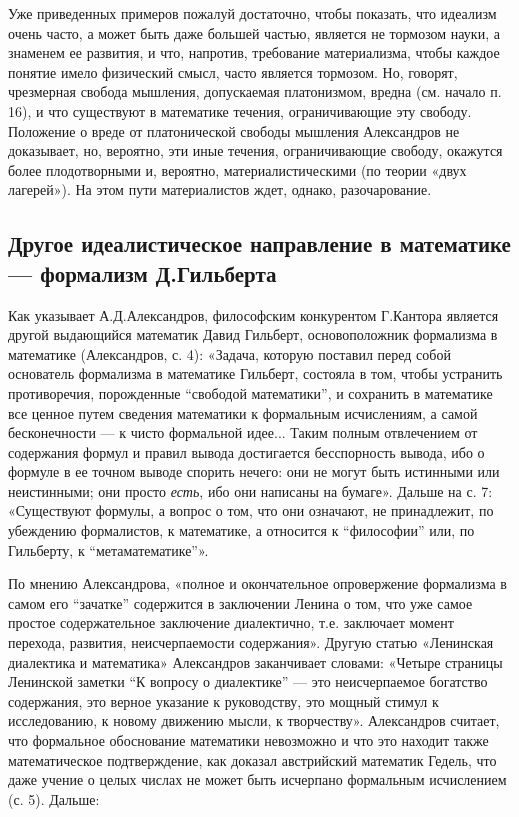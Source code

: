 Уже  приведенных  примеров  пожалуй достаточно,  чтобы  показать,  что
идеализм  очень часто,  а  может быть  даже  большей частью,  является
не  тормозом  науки,   а  знаменем  ее  развития,   и  что,  напротив,
требование материализма, чтобы каждое  понятие имело физический смысл,
часто  является тормозом.  Но, говорят,  чрезмерная свобода  мышления,
допускаемая платонизмом, вредна (см. начало п. 16), и что существуют в
математике  течения, ограничивающие  эту  свободу.  Положение о  вреде
от  платонической  свободы  мышления Александров  не  доказывает,  но,
вероятно,  эти иные  течения, ограничивающие  свободу, окажутся  более
плодотворными  и,  вероятно,   материалистическими  (по  теории  «двух
лагерей»). На этом пути материалистов ждет, однако, разочарование.

\subsection{Другое  идеалистическое   направление  в   математике  ---
формализм Д.Гильберта}

Как  указывает  А.Д.Александров,   философским  конкурентом  Г.Кантора
является  другой выдающийся  математик Давид  Гильберт, основоположник
формализма  в   математике  (Александров,  с.  4):   «Задача,  которую
поставил  перед собой  основатель  формализма  в математике  Гильберт,
состояла в  том, чтобы устранить противоречия,  порожденные ``свободой
математики'',  и  сохранить в  математике  все  ценное путем  сведения
математики к формальным исчислениям, а самой бесконечности --- к чисто
формальной  идее... Таким  полным отвлечением  от содержания  формул и
правил  вывода достигается  бесспорность вывода,  ибо о  формуле в  ее
точном  выводе  спорить  нечего:  они  не  могут  быть  истинными  или
неистинными;  они просто  \emph{есть},  ибо они  написаны на  бумаге».
Дальше на с. 7: «Существуют формулы, а вопрос о том, что они означают,
не принадлежит, по убеждению формалистов,  к математике, а относится к
``философии'' или, по Гильберту, к ``метаматематике''».

По   мнению  Александрова,   «полное   и  окончательное   опровержение
формализма в  самом его ``зачатке''  содержится в заключении  Ленина о
том, что уже самое простое содержательное заключение диалектично, т.е.
заключает  момент  перехода,  развития,  неисчерпаемости  содержания».
Другую   статью  «Ленинская   диалектика  и   математика»  Александров
заканчивает словами:  «Четыре страницы  Ленинской заметки  ``К вопросу
о  диалектике''  ---  это   неисчерпаемое  богатство  содержания,  это
верное  указание  к руководству,  это  мощный  стимул к  исследованию,
к  новому  движению мысли,  к  творчеству».  Александров считает,  что
формальное  обоснование  математики  невозможно   и  что  это  находит
также математическое подтверждение,  как доказал австрийский математик
Гедель,  что  даже учение  о  целых  числах  не может  быть  исчерпано
формальным исчислением (с. 5). Дальше:

